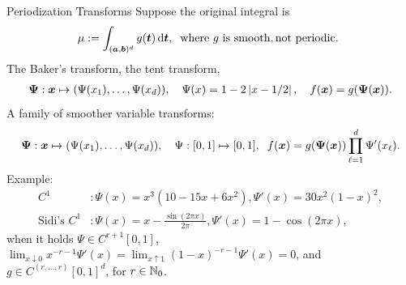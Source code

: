 \documentclass[handout, 10pt,compress,xcolor={usenames,dvipsnames}]{beamer} %
\newcommand{\bm}[1]{\boldsymbol{#1}}
\newcommand{\vPsi}{\bm{ \Psi}}
\newcommand{\pause}{}
\def\abs#1{\ensuremath{\left \lvert #1 \right \rvert}}
\begin{document}
\begin{frame}{Periodization Transforms}
	\vspace*{-5ex}
	Suppose the original integral is \vspace*{-1ex}
	\begin{equation*}
	\mu := \int_{(\boldsymbol{a},\boldsymbol{b})^d} g(\boldsymbol{t}) \, {\rm d} \boldsymbol{t}, \hspace{0.2cm}
	\text{where $g$ is smooth}, \text{not periodic. }
	\end{equation*}
	The Baker's transform, the tent transform, \vspace*{-1ex}
	\begin{align*} %
	\vPsi: \vx \mapsto (\Psi(x_1),  \ldots, \Psi(x_d)),  \quad \Psi(x)  =1 - 2 \abs{x - 1/2}, \quad f(\vx) = g(\vPsi(\vx)).
	\end{align*} \pause
	A family of smoother variable transforms: \vspace*{-3ex}
	\begin{align*}
	\vPsi: \vx \mapsto (\Psi(x_1),  \ldots, \Psi(x_d)), \quad \Psi:[0,1] \mapsto [0,1], \hspace{0.2cm}
	f(\vx) = g(\vPsi(\vx)) \prod_{\ell = 1}^d \Psi'(x_\ell).
	\end{align*}
	Example: \vspace*{-2ex}
	\begin{align*}
	C^1 & : \Psi(x) = x^3(10-15x+6x^2), \Psi'(x) = 30x^2(1-x)^2, \\
	\text{Sidi's } C^1 & : \Psi(x) = x - \frac{\sin(2\pi x)}{2 \pi}, \Psi'(x) = 1 - \cos(2\pi x),
	\end{align*}
	when it holds
	$\Psi \in C^{r+1}[0,1]$,
	$\lim_{x \downarrow 0}x^{-r-1}\Psi'(x) = \lim_{x \uparrow 1} (1-x)^{-r-1}\Psi'(x) = 0$, and 
	$g \in C^{(r, \ldots, r)}[0,1]^d$, for $r \in \mathbb{N}_{0}$.
\end{frame}
\end{document}
